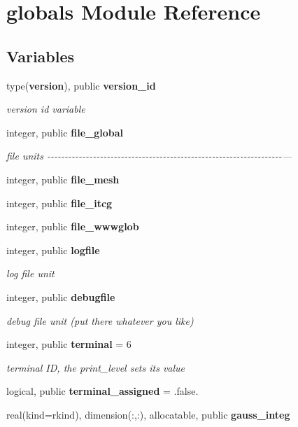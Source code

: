 \section{globals Module Reference}
\label{namespaceglobals}
\subsection*{Variables}
\begin{DoxyCompactItemize}
\item 
type({\bf version}), public {\bf version\+\_\+id}
\begin{DoxyCompactList}\small\item\em version id variable \end{DoxyCompactList}\item 
integer, public {\bf file\+\_\+global}
\begin{DoxyCompactList}\small\item\em file units -\/-\/-\/-\/-\/-\/-\/-\/-\/-\/-\/-\/-\/-\/-\/-\/-\/-\/-\/-\/-\/-\/-\/-\/-\/-\/-\/-\/-\/-\/-\/-\/-\/-\/-\/-\/-\/-\/-\/-\/-\/-\/-\/-\/-\/-\/-\/-\/-\/-\/-\/-\/-\/-\/-\/-\/-\/-\/-\/-\/-\/-\/-\/-\/-\/-\/-\/--- \end{DoxyCompactList}\item 
integer, public {\bf file\+\_\+mesh}
\item 
integer, public {\bf file\+\_\+itcg}
\item 
integer, public {\bf file\+\_\+wwwglob}
\item 
integer, public {\bf logfile}
\begin{DoxyCompactList}\small\item\em log file unit \end{DoxyCompactList}\item 
integer, public {\bf debugfile}
\begin{DoxyCompactList}\small\item\em debug file unit (put there whatever you like) \end{DoxyCompactList}\item 
integer, public {\bf terminal} = 6
\begin{DoxyCompactList}\small\item\em terminal ID, the print\+\_\+level sets its value \end{DoxyCompactList}\item 
logical, public {\bf terminal\+\_\+assigned} = .false.
\item 
real(kind=rkind), dimension(\+:,\+:), allocatable, public {\bf gauss\+\_\+integ}

\end{DoxyCompactItemize}
